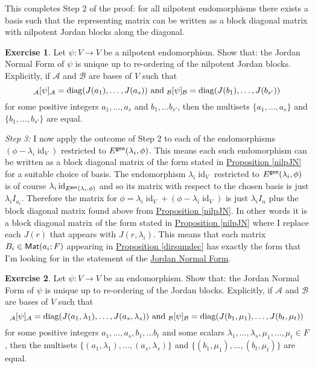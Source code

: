 \documentclass[11pt]{amsbook}
\DeclareMathOperator{\id}{\mathrm{id}}
\theoremstyle{definition}
\newtheorem{exercise}{Exercise}
\begin{document}
This completes Step 2 of the proof: for all nilpotent endomorphisms there exists a basis such that the representing matrix can be written as a block diagonal matrix with nilpotent Jordan blocks along the diagonal.

\begin{exercise}
Let $\psi: V\to V$ be a nilpotent endomorphism. Show that: the Jordan Normal Form of $\psi$ is unique up to re-ordering of the nilpotent Jordan blocks. Explicitly, if $\mathcal{A}$ and $\mathcal{B}$ are bases of $V$ such that $${}_{\mathcal{A}}[\psi]_{\mathcal{A}} =   {\rm diag}(J(a_1), \ldots , J(a_s)) \text{ and } {}_{\mathcal{B}}[\psi]_{\mathcal{B}} =   {\rm diag}(J(b_1), \ldots , J(b_{s'}))$$ for some positive integers $a_1, \ldots , a_s$ and $b_1, \ldots b_{s'}$, then the multisets $\{ a_1, \ldots , a_s \}$ and $\{b_1, \ldots , b_{s'}\}$ are equal.
\end{exercise}
\medskip

\noindent
{\it Step 3:} I now apply the outcome of Step 2 to each of the endomorphisms $(\phi- \lambda_i \id_V)$ restricted to $E^{\sf gen}(\lambda_i, \phi)$. This means each such endomorphism can be written as a block diagonal matrix of the form stated in \hyperref[nilpJN]{Proposition \ref{nilpJN}} for a suitable choice of basis. The endomorphism $\lambda_i \id_V$ restricted to $E^{\sf gen}(\lambda_i, \phi)$ is of course $\lambda_i \id_{E^{\sf gen}(\lambda_i, \phi)}$ and so its matrix with respect to the chosen basis is just $\lambda_i I_{a_i}$. Therefore the matrix for $\phi = \lambda_i \id_V +  (\phi- \lambda_i \id_V) $ is just $\lambda_iI_n$ plus the block diagonal matrix found above from \hyperref[nilpJN]{Proposition \ref{nilpJN}}. In other words it is a block diagonal matrix of the form stated in \hyperref[nilpJN]{Proposition \ref{nilpJN}} where I replace each $J(r)$ that appears with $J(r, \lambda_i)$.  This means that each matrix $B_i \in {\sf Mat}(a_i; F)$ appearing in \hyperref[dirsumdec]{Proposition \ref{dirsumdec}} has exactly the form that I'm looking for in the statement of the \hyperref[JNFtheorem]{Jordan Normal Form}.

\begin{exercise}
Let $\psi: V\to V$ be an endomorphism. Show that: the Jordan Normal Form of $\psi$ is unique up to re-ordering of the Jordan blocks. Explicitly, if $\mathcal{A}$ and $\mathcal{B}$ are bases of $V$ such that $${}_{\mathcal{A}}[\psi]_{\mathcal{A}} =   {\rm diag}(J(a_1, \lambda_1), \ldots , J(a_s, \lambda_s)) \text{ and } {}_{\mathcal{B}}[\psi]_{\mathcal{B}} =   {\rm diag}(J(b_1,\mu_1), \ldots , J(b_t, \mu_t))$$ for some positive integers $a_1, \ldots , a_s, b_1, \ldots b_t$ and some scalars $\lambda_1, \ldots, \lambda_s, \mu_1, \ldots , \mu_t\in F$, then the multisets $\{ (a_1, \lambda_1), \ldots , (a_s, \lambda_s) \}$ and $\{(b_1, \mu_1), \ldots , (b_t, \mu_t)\}$ are equal.
\end{exercise}
\end{document}
